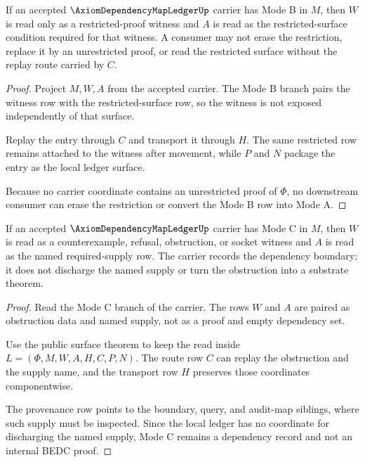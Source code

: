 \begin{theorem}
\label{thm:axiom-dependency-map-ledger-mode-b}
If an accepted $\AxiomDependencyMapLedgerUp$ carrier has Mode B in $M$, then $W$ is read only as a restricted-proof witness and $A$ is read as the restricted-surface condition required for that witness. A consumer may not erase the restriction, replace it by an unrestricted proof, or read the restricted surface without the replay route carried by $C$.
\end{theorem}
\begin{proof}
Project $M,W,A$ from the accepted carrier. The Mode B branch pairs the witness row with the restricted-surface row, so the witness is not exposed independently of that surface.

Replay the entry through $C$ and transport it through $H$. The same restricted row remains attached to the witness after movement, while $P$ and $N$ package the entry as the local ledger surface.

Because no carrier coordinate contains an unrestricted proof of $\Phi$, no downstream consumer can erase the restriction or convert the Mode B row into Mode A.
\end{proof}

\begin{theorem}
\label{thm:axiom-dependency-map-ledger-mode-c}
If an accepted $\AxiomDependencyMapLedgerUp$ carrier has Mode C in $M$, then $W$ is read as a counterexample, refusal, obstruction, or socket witness and $A$ is read as the named required-supply row. The carrier records the dependency boundary; it does not discharge the named supply or turn the obstruction into a substrate theorem.
\end{theorem}
\begin{proof}
Read the Mode C branch of the carrier. The rows $W$ and $A$ are paired as obstruction data and named supply, not as a proof and empty dependency set.

Use the public surface theorem to keep the read inside $L=(\Phi,M,W,A,H,C,P,N)$. The route row $C$ can replay the obstruction and the supply name, and the transport row $H$ preserves those coordinates componentwise.

The provenance row points to the boundary, query, and audit-map siblings, where such supply must be inspected. Since the local ledger has no coordinate for discharging the named supply, Mode C remains a dependency record and not an internal BEDC proof.
\end{proof}


